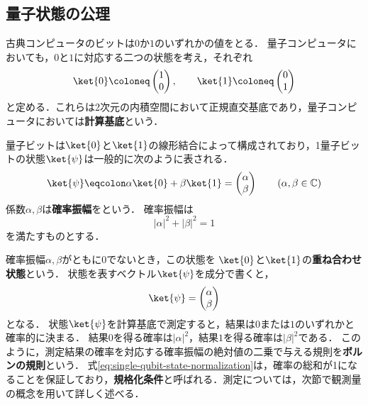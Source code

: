 \subsection{量子状態の公理}

\begin{defi}[計算基底]
古典コンピュータのビットは$0$か$1$のいずれかの値をとる．
量子コンピュータにおいても，$0$と$1$に対応する二つの状態を考え，それぞれ
\begin{equation*}
  \ket{0}\coloneq\begin{pmatrix}1\\0\end{pmatrix},
  \qquad
  \ket{1}\coloneq\begin{pmatrix}0\\1\end{pmatrix}
\end{equation*}
と定める．これらは2次元の内積空間において正規直交基底であり，量子コンピュータにおいては\textbf{計算基底}という．

量子ビットは$\ket{0}$と$\ket{1}$の線形結合によって構成されており，1量子ビットの状態$\ket{\psi}$は一般的に次のように表される．
\begin{equation*}
  \ket{\psi}\eqcolon\alpha\ket{0}+\beta\ket{1} = \begin{pmatrix}\alpha\\\beta\end{pmatrix}
  \qquad
  (\alpha,\beta\in\mathbb C)
\end{equation*}
係数$\alpha,\beta$は\textbf{確率振幅}をという．
確率振幅は
\begin{equation}
  |\alpha|^2+|\beta|^2=1
  \label{eq:single-qubit-state-normalization}
\end{equation}
を満たすものとする．
\end{defi}

確率振幅$\alpha,\beta$がともに$0$でないとき，この状態を
$\ket{0}$と$\ket{1}$の\textbf{重ね合わせ状態}という．
状態を表すベクトル$\ket{\psi}$を成分で書くと，
\begin{equation*}
  \ket{\psi}=
  \begin{pmatrix}
    \alpha\\\beta
  \end{pmatrix}
\end{equation*}
となる．
状態$\ket{\psi}$を計算基底で測定すると，結果は$0$または$1$のいずれかと確率的に決まる．
結果$0$を得る確率は$|\alpha|^2$，結果$1$を得る確率は$|\beta|^2$である．
このように，測定結果の確率を対応する確率振幅の絶対値の二乗で与える規則を\textbf{ボルンの規則}という．
式\eqref{eq:single-qubit-state-normalization}は，確率の総和が1になることを保証しており，\textbf{規格化条件}と呼ばれる．測定については，次節で観測量の概念を用いて詳しく述べる．

